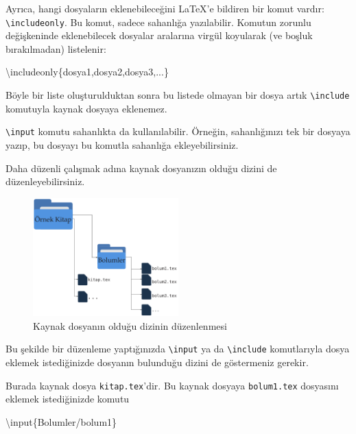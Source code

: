 \documentclass[
  10pt,
]{scrbook}
\newenvironment{Shaded}{\begin{snugshade}}{\end{snugshade}}
\newcommand{\FunctionTok}[1]{\textcolor[rgb]{0.00,0.00,0.00}{#1}}
\newcommand{\NormalTok}[1]{#1}
\theoremstyle{definition}
\theoremstyle{definition}
\theoremstyle{definition}
\theoremstyle{definition}
\theoremstyle{remark}
\begin{document}
Ayrıca, hangi dosyaların eklenebileceğini LaTeX'e bildiren bir komut vardır: \texttt{\textbackslash{}includeonly}. Bu komut, sadece sahanlığa yazılabilir. Komutun zorunlu değişkeninde eklenebilecek dosyalar aralarına virgül koyularak (ve boşluk bırakılmadan) listelenir:

\begin{Shaded}
\begin{Highlighting}[]
\FunctionTok{\textbackslash{}includeonly}\NormalTok{\{dosya1,dosya2,dosya3,...\}}
\end{Highlighting}
\end{Shaded}

Böyle bir liste oluşturulduktan sonra bu listede olmayan bir dosya artık \texttt{\textbackslash{}include} komutuyla kaynak dosyaya eklenemez.

\texttt{\textbackslash{}input} komutu sahanlıkta da kullanılabilir. Örneğin, sahanlığınızı tek bir dosyaya yazıp, bu dosyayı bu komutla sahanlığa ekleyebilirsiniz.

Daha düzenli çalışmak adına kaynak dosyanızın olduğu dizini de düzenleyebilirsiniz.

\begin{figure}
\centering
\includegraphics[width=0.5\textwidth,height=\textheight]{images/dizin.png}
\caption{Kaynak dosyanın olduğu dizinin düzenlenmesi}
\end{figure}

Bu şekilde bir düzenleme yaptığınızda \texttt{\textbackslash{}input} ya da \texttt{\textbackslash{}include} komutlarıyla dosya eklemek istediğinizde dosyanın bulunduğu dizini de göstermeniz gerekir.

Burada kaynak dosya \texttt{kitap.tex}'dir. Bu kaynak dosyaya \texttt{bolum1.tex} dosyasını eklemek istediğinizde komutu

\begin{Shaded}
\begin{Highlighting}[]
\FunctionTok{\textbackslash{}input}\NormalTok{\{Bolumler/bolum1\}}
\end{Highlighting}
\end{Shaded}
\end{document}
